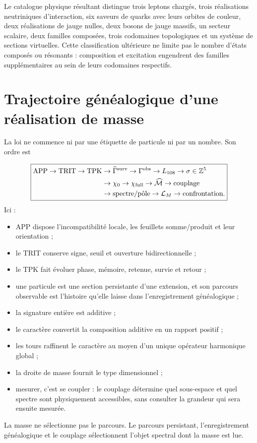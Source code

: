 Le catalogue physique résultant distingue trois leptons chargés, trois réalisations neutriniques d'interaction, six saveurs de quarks avec leurs orbites de couleur, deux réalisations de jauge nulles, deux bosons de jauge massifs, un secteur scalaire, deux familles composées, trois codomaines topologiques et un système de sections virtuelles. Cette classification ultérieure ne limite pas le nombre d'états composés ou résonants : composition et excitation engendrent des familles supplémentaires au sein de leurs codomaines respectifs.

\section{Trajectoire généalogique d'une réalisation de masse}
La loi ne commence ni par une étiquette de particule ni par un nombre. Son ordre est

\[
\boxed{
\begin{aligned}
\mathrm{APP}\to\mathrm{TRIT}\to\mathrm{TPK}
&\to\widetilde\Gamma^{\rm surv}
\to\Gamma^{\rm obs}
\to L_{108}
\to\sigma\in\mathbb Z^5\\
&\to\chi_0
\to\chi_{\rm full}
\to\widehat{\mathcal M}
\to\text{couplage}\\
&\to\text{spectre/pôle}
\to\mathcal L_M
\to\text{confrontation}.
\end{aligned}}
\]
Ici :

\begin{itemize}
\item APP dispose l'incompatibilité locale, les feuillets somme/produit et leur orientation ;
\item le TRIT conserve signe, seuil et ouverture bidirectionnelle ;
\item le TPK fait évoluer phase, mémoire, retenue, survie et retour ;
\item une particule est une section persistante d'une extension, et son parcours observable est
l'histoire qu'elle laisse dans l'enregistrement généalogique ;

\item la signature entière est additive ;
\item le caractère convertit la composition additive en un rapport positif ;
\item les tours raffinent le caractère au moyen d'un unique opérateur harmonique global ;
\item la droite de masse fournit le type dimensionnel ;
\item mesurer, c'est se coupler : le couplage détermine quel sous-espace et quel spectre sont
physiquement accessibles, sans consulter la grandeur qui sera ensuite mesurée.

\end{itemize}
La masse ne sélectionne pas le parcours. Le parcours persistant, l'enregistrement généalogique et le couplage sélectionnent l'objet spectral dont la masse est lue.

